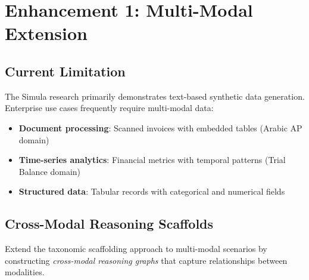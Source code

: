 \documentclass[12pt,a4paper,twoside]{report}
\begin{document}
\section{Enhancement 1: Multi-Modal Extension}

\subsection{Current Limitation}

The Simula research primarily demonstrates text-based synthetic data generation.
Enterprise use cases frequently require multi-modal data:
\begin{itemize}
\item \textbf{Document processing}: Scanned invoices with embedded tables (Arabic AP domain)
\item \textbf{Time-series analytics}: Financial metrics with temporal patterns (Trial Balance domain)
\item \textbf{Structured data}: Tabular records with categorical and numerical fields
\end{itemize}

\subsection{Cross-Modal Reasoning Scaffolds}

Extend the taxonomic scaffolding approach to multi-modal scenarios by constructing
\emph{cross-modal reasoning graphs} that capture relationships between modalities.
\end{document}
